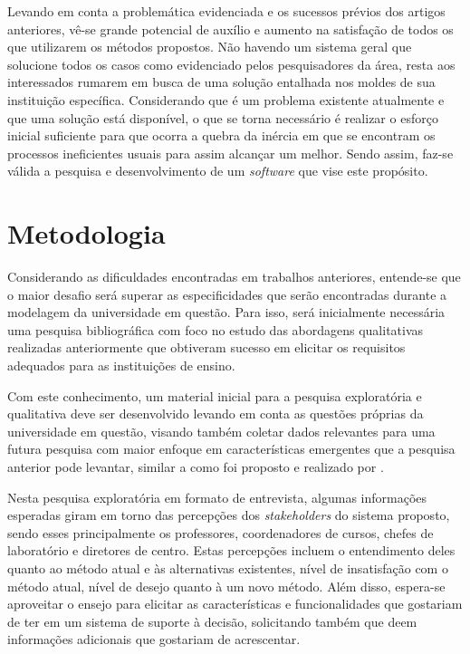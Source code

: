 Levando em conta a problemática evidenciada e os sucessos prévios dos artigos anteriores, vê-se grande potencial de auxílio e aumento na satisfação de todos os que utilizarem os métodos propostos. Não havendo um sistema geral que solucione todos os casos como evidenciado pelos pesquisadores da área, resta aos interessados rumarem em busca de uma solução entalhada nos moldes de sua instituição específica. Considerando que é um problema existente atualmente e que uma solução está disponível, o que se torna necessário é realizar o esforço inicial suficiente para que ocorra a quebra da inércia em que se encontram os processos ineficientes usuais para assim alcançar um melhor. Sendo assim, faz-se válida a pesquisa e desenvolvimento de um \textit{software} que vise este propósito.

\section{Metodologia} \label{sec:Metodologia} %

Considerando as dificuldades encontradas em trabalhos anteriores, entende-se que o maior desafio será superar as especificidades que serão encontradas durante a modelagem da universidade em questão. Para isso, será inicialmente necessária uma pesquisa bibliográfica com foco no estudo das abordagens qualitativas realizadas anteriormente que obtiveram sucesso em elicitar os requisitos adequados para as instituições de ensino.

Com este conhecimento, um material inicial para a pesquisa exploratória e qualitativa deve ser desenvolvido levando em conta as questões próprias da universidade em questão, visando também coletar dados relevantes para uma futura pesquisa com maior enfoque em características emergentes que a pesquisa anterior pode levantar, similar a como foi proposto e realizado por .

Nesta pesquisa exploratória em formato de entrevista, algumas informações esperadas giram em torno das percepções dos \textit{stakeholders} do sistema proposto, sendo esses principalmente os professores, coordenadores de cursos, chefes de laboratório e diretores de centro. Estas percepções incluem o entendimento deles quanto ao método atual e às alternativas existentes, nível de insatisfação com o método atual, nível de desejo quanto à um novo método. Além disso, espera-se aproveitar o ensejo para elicitar as características e funcionalidades que gostariam de ter em um sistema de suporte à decisão, solicitando também que deem informações adicionais que gostariam de acrescentar.

